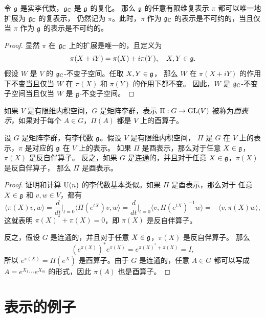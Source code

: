 \begin{proposition}
  令 $\mathfrak{g}$ 是实李代数，$\mathfrak{g}_{\mathbb{C}}$ 是 $\mathfrak{g}$ 的复化。
  那么 $\mathfrak{g}$ 的任意有限维复表示 $\pi$ 都可以唯一地扩展为 $\mathfrak{g}_{\mathbb{C}}$ 的复表示，
  仍然记为 $\pi$。此时，$\pi$ 作为 $\mathfrak{g}_{\mathbb{C}}$ 的表示是不可约的，当且仅当
  $\pi$ 作为 $\mathfrak{g}$ 的表示是不可约的。
\end{proposition}
\begin{proof}
  显然 $\pi$ 在 $\mathfrak{g}_{\mathbb{C}}$ 上的扩展是唯一的，且定义为
  \[
    \pi(X+iY)=\pi(X)+i\pi(Y),\quad X,Y\in\mathfrak{g}.
  \]
  假设 $W$ 是 $V$ 的 $\mathfrak{g}_{\mathbb{C}}$-不变子空间。任取 $X,Y\in\mathfrak{g}$，
  那么 $W$ 在 $\pi(X+iY)$ 的作用下不变当且仅当 $W$ 在 $\pi(X)$ 和 $\pi(Y)$ 的作用下都不变。
  因此，$W$ 是 $\mathfrak{g}_{\mathbb{C}}$-不变子空间当且仅当 $W$ 是 $\mathfrak{g}$-不变子空间。
\end{proof}

\begin{definition}
  如果 $V$ 是有限维内积空间，$G$ 是矩阵李群，表示 $\Pi:G\to\operatorname{GL}(V)$
  被称为\emph{酉表示}，如果对于每个 $A\in G$，$\Pi(A)$ 都是 $V$ 上的酉算子。
\end{definition}

\begin{proposition}
  设 $G$ 是矩阵李群，有李代数 $\mathfrak{g}$。假设 $V$ 是有限维内积空间，
  $\Pi$ 是 $G$ 在 $V$ 上的表示，$\pi$ 是对应的 $\mathfrak{g}$ 在 $V$ 上的表示。
  如果 $\Pi$ 是酉表示，那么对于任意 $X\in\mathfrak{g}$，$\pi(X)$ 是反自伴算子。
  反之，如果 $G$ 是连通的，并且对于任意 $X\in\mathfrak{g}$，$\pi(X)$ 是反自伴算子，
  那么 $\Pi$ 是酉表示。
\end{proposition}
\begin{proof}
  证明和计算 $\operatorname{U}(n)$ 的李代数基本类似。如果 $\Pi$ 是酉表示，那么对于
  任意 $X\in\mathfrak{g}$ 和 $v,w\in V$，都有
  \[
    \langle \pi(X)v,w\rangle=\frac{d}{dt}\bigg|_{t=0} 
    \bigl\langle \Pi(e^{tX})v,w\bigr\rangle
    =\frac{d}{dt}\bigg|_{t=0} \langle v,\Pi(e^{tX})^{-1}w\rangle
    =-\langle v,\pi(X)w\rangle,
  \]
  这就表明 $\pi(X)^*+\pi(X)=0$，即 $\pi(X)$ 是反自伴算子。

  反之，假设 $G$ 是连通的，并且对于任意 $X\in\mathfrak{g}$，$\pi(X)$ 是反自伴算子。
  那么
  \[
    (e^{\pi(X)})^*e^{\pi(X)}=e^{\pi(X)^*+\pi(X)}=I,
  \]
  所以 $e^{\pi(X)}=\Pi(e^X)$ 是酉算子。由于 $G$ 是连通的，任意 $A\in G$ 都可以写成
  $A=e^{X_1}\cdots e^{X_m}$ 的形式，因此 $\pi(A)$ 也是酉算子。
\end{proof}

\section{表示的例子}

